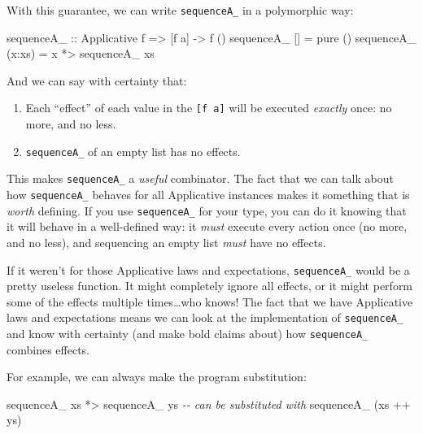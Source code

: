 \documentclass[]{article}
\newenvironment{Shaded}{}{}
\newcommand{\CommentTok}[1]{\textcolor[rgb]{0.38,0.63,0.69}{\textit{#1}}}
\newcommand{\DataTypeTok}[1]{\textcolor[rgb]{0.56,0.13,0.00}{#1}}
\newcommand{\FunctionTok}[1]{\textcolor[rgb]{0.02,0.16,0.49}{#1}}
\newcommand{\NormalTok}[1]{#1}
\newcommand{\OperatorTok}[1]{\textcolor[rgb]{0.40,0.40,0.40}{#1}}
\newcommand{\OtherTok}[1]{\textcolor[rgb]{0.00,0.44,0.13}{#1}}
\begin{document}
With this guarantee, we can write \texttt{sequenceA\_} in a polymorphic way:

\begin{Shaded}
\begin{Highlighting}[]
\OtherTok{sequenceA\_ ::} \DataTypeTok{Applicative}\NormalTok{ f }\OtherTok{=>}\NormalTok{ [f a] }\OtherTok{{-}>}\NormalTok{ f ()}
\NormalTok{sequenceA\_ []     }\OtherTok{=} \FunctionTok{pure}\NormalTok{ ()}
\NormalTok{sequenceA\_ (x}\OperatorTok{:}\NormalTok{xs) }\OtherTok{=}\NormalTok{ x }\OperatorTok{*>}\NormalTok{ sequenceA\_ xs}
\end{Highlighting}
\end{Shaded}

And we can say with certainty that:

\begin{enumerate}
\def\labelenumi{\arabic{enumi}.}
\tightlist
\item
  Each ``effect'' of each value in the \texttt{{[}f\ a{]}} will be executed
  \emph{exactly} once: no more, and no less.
\item
  \texttt{sequenceA\_} of an empty list has no effects.
\end{enumerate}

This makes \texttt{sequenceA\_} a \emph{useful} combinator. The fact that we can
talk about how \texttt{sequenceA\_} behaves for all Applicative instances makes
it something that is \emph{worth} defining. If you use \texttt{sequenceA\_} for
your type, you can do it knowing that it will behave in a well-defined way: it
\emph{must} execute every action once (no more, and no less), and sequencing an
empty list \emph{must} have no effects.

If it weren't for those Applicative laws and expectations, \texttt{sequenceA\_}
would be a pretty useless function. It might completely ignore all effects, or
it might perform some of the effects multiple times\ldots who knows! The fact
that we have Applicative laws and expectations means we can look at the
implementation of \texttt{sequenceA\_} and know with certainty (and make bold
claims about) how \texttt{sequenceA\_} combines effects.

For example, we can always make the program substitution:

\begin{Shaded}
\begin{Highlighting}[]
\NormalTok{sequenceA\_ xs }\OperatorTok{*>}\NormalTok{ sequenceA\_ ys}
\CommentTok{{-}{-} can be substituted with}
\NormalTok{sequenceA\_ (xs }\OperatorTok{++}\NormalTok{ ys)}
\end{Highlighting}
\end{Shaded}
\end{document}
